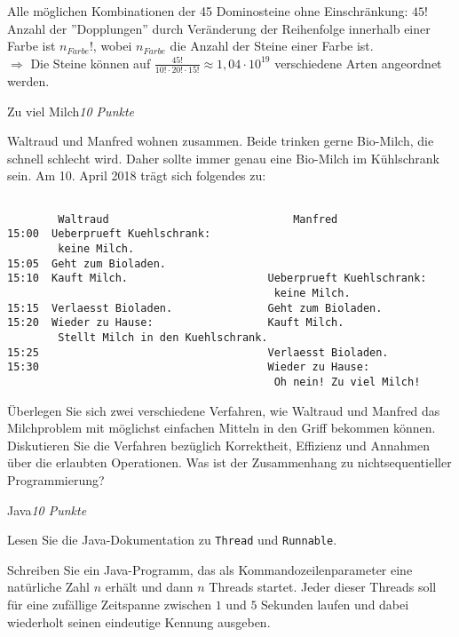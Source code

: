 \documentclass[a4paper,twoside,12pt]{article}
\newcounter{AUFGNR}
\newcommand{\AUFGABE}[2]{\vspace{0.3cm}\item[Aufgabe~\arabic{AUFGNR}]\stepcounter{AUFGNR} #1\hfill\emph{#2}}
\begin{document}
\begin{description}
\begin{enumerate}
  Alle m\"oglichen Kombinationen der 45 Dominosteine ohne Einschr\"ankung: $45!$\\
  Anzahl der ''Dopplungen'' durch Ver\"anderung der Reihenfolge innerhalb einer Farbe
  ist $n_{Farbe}!$, wobei $n_{Farbe}$ die Anzahl der Steine einer Farbe ist.\\
  $\Rightarrow$ Die Steine können auf $\frac{45!}{10! \cdot 20! \cdot 15!}
  \approx 1,04 \cdot 10^{19}$ verschiedene Arten angeordnet werden.
\end{enumerate}

\AUFGABE{Zu viel Milch}{10 Punkte}

Waltraud und Manfred wohnen zusammen.
Beide trinken gerne Bio-Milch, die schnell schlecht wird.
Daher sollte immer genau eine Bio-Milch im K\"uhlschrank sein.
Am 10. April 2018 tr\"agt sich folgendes zu:
\begin{verbatim}

        Waltraud	                         Manfred
15:00  Ueberprueft Kuehlschrank:
        keine Milch.
15:05  Geht zum Bioladen.
15:10  Kauft Milch.                      Ueberprueft Kuehlschrank:
                                          keine Milch.
15:15  Verlaesst Bioladen.               Geht zum Bioladen.
15:20  Wieder zu Hause:                  Kauft Milch.
        Stellt Milch in den Kuehlschrank.
15:25                                    Verlaesst Bioladen.
15:30                                    Wieder zu Hause:
                                          Oh nein! Zu viel Milch!
\end{verbatim}

\"Uberlegen Sie sich zwei verschiedene Verfahren, wie Waltraud
und Manfred das Milchproblem mit m\"oglichst einfachen Mitteln
in den Griff bekommen k\"onnen.
Diskutieren Sie die Verfahren bez\"uglich Korrektheit, Effizienz
und Annahmen \"uber die erlaubten Operationen.
Was ist der Zusammenhang zu nichtsequentieller Programmierung?

\AUFGABE{Java}{10 Punkte}

Lesen Sie die Java-Dokumentation zu \texttt{Thread}
und \texttt{Runnable}.

Schreiben Sie ein Java-Programm, das als Kommandozeilenparameter eine
nat\"urliche Zahl $n$ erh\"alt und dann $n$ Threads startet.
Jeder dieser Threads soll f\"ur eine zuf\"allige Zeitspanne zwischen
$1$ und $5$ Sekunden laufen und dabei wiederholt seinen eindeutige
Kennung ausgeben.
\end{description}
\end{document}
